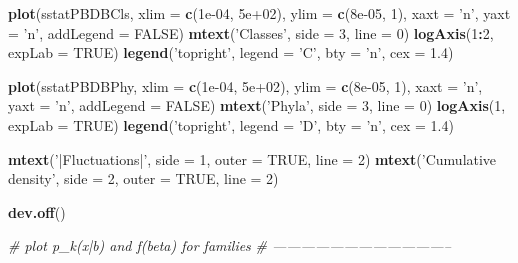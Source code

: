 \documentclass[]{article}
\newenvironment{Shaded}{\begin{snugshade}}{\end{snugshade}}
\newcommand{\KeywordTok}[1]{\textcolor[rgb]{0.13,0.29,0.53}{\textbf{#1}}}
\newcommand{\DataTypeTok}[1]{\textcolor[rgb]{0.13,0.29,0.53}{#1}}
\newcommand{\DecValTok}[1]{\textcolor[rgb]{0.00,0.00,0.81}{#1}}
\newcommand{\FloatTok}[1]{\textcolor[rgb]{0.00,0.00,0.81}{#1}}
\newcommand{\StringTok}[1]{\textcolor[rgb]{0.31,0.60,0.02}{#1}}
\newcommand{\CommentTok}[1]{\textcolor[rgb]{0.56,0.35,0.01}{\textit{#1}}}
\newcommand{\OtherTok}[1]{\textcolor[rgb]{0.56,0.35,0.01}{#1}}
\newcommand{\OperatorTok}[1]{\textcolor[rgb]{0.81,0.36,0.00}{\textbf{#1}}}
\newcommand{\NormalTok}[1]{#1}
\begin{document}
\begin{Shaded}
\begin{Highlighting}[]
{\KeywordTok{plot}\NormalTok{(sstatPBDBCls, }\DataTypeTok{xlim =} \KeywordTok{c}\NormalTok{(}\FloatTok{1e-04}\NormalTok{, }\FloatTok{5e+02}\NormalTok{), }\DataTypeTok{ylim =} \KeywordTok{c}\NormalTok{(}\FloatTok{8e-05}\NormalTok{, }\DecValTok{1}\NormalTok{), }\DataTypeTok{xaxt =} \StringTok{'n'}\NormalTok{, }\DataTypeTok{yaxt =} \StringTok{'n'}\NormalTok{, }
     \DataTypeTok{addLegend =} \OtherTok{FALSE}\NormalTok{)}
\KeywordTok{mtext}\NormalTok{(}\StringTok{'Classes'}\NormalTok{, }\DataTypeTok{side =} \DecValTok{3}\NormalTok{, }\DataTypeTok{line =} \DecValTok{0}\NormalTok{)}
\KeywordTok{logAxis}\NormalTok{(}\DecValTok{1}\OperatorTok{:}\DecValTok{2}\NormalTok{, }\DataTypeTok{expLab =} \OtherTok{TRUE}\NormalTok{)}
\KeywordTok{legend}\NormalTok{(}\StringTok{'topright'}\NormalTok{, }\DataTypeTok{legend =} \StringTok{'C'}\NormalTok{, }\DataTypeTok{bty =} \StringTok{'n'}\NormalTok{, }\DataTypeTok{cex =} \FloatTok{1.4}\NormalTok{)}

\KeywordTok{plot}\NormalTok{(sstatPBDBPhy, }\DataTypeTok{xlim =} \KeywordTok{c}\NormalTok{(}\FloatTok{1e-04}\NormalTok{, }\FloatTok{5e+02}\NormalTok{), }\DataTypeTok{ylim =} \KeywordTok{c}\NormalTok{(}\FloatTok{8e-05}\NormalTok{, }\DecValTok{1}\NormalTok{), }\DataTypeTok{xaxt =} \StringTok{'n'}\NormalTok{, }\DataTypeTok{yaxt =} \StringTok{'n'}\NormalTok{, }
     \DataTypeTok{addLegend =} \OtherTok{FALSE}\NormalTok{)}
\KeywordTok{mtext}\NormalTok{(}\StringTok{'Phyla'}\NormalTok{, }\DataTypeTok{side =} \DecValTok{3}\NormalTok{, }\DataTypeTok{line =} \DecValTok{0}\NormalTok{)}
\KeywordTok{logAxis}\NormalTok{(}\DecValTok{1}\NormalTok{, }\DataTypeTok{expLab =} \OtherTok{TRUE}\NormalTok{)}
\KeywordTok{legend}\NormalTok{(}\StringTok{'topright'}\NormalTok{, }\DataTypeTok{legend =} \StringTok{'D'}\NormalTok{, }\DataTypeTok{bty =} \StringTok{'n'}\NormalTok{, }\DataTypeTok{cex =} \FloatTok{1.4}\NormalTok{)}

\KeywordTok{mtext}\NormalTok{(}\StringTok{'|Fluctuations|'}\NormalTok{, }\DataTypeTok{side =} \DecValTok{1}\NormalTok{, }\DataTypeTok{outer =} \OtherTok{TRUE}\NormalTok{, }\DataTypeTok{line =} \DecValTok{2}\NormalTok{)}
\KeywordTok{mtext}\NormalTok{(}\StringTok{'Cumulative density'}\NormalTok{, }\DataTypeTok{side =} \DecValTok{2}\NormalTok{, }\DataTypeTok{outer =} \OtherTok{TRUE}\NormalTok{, }\DataTypeTok{line =} \DecValTok{2}\NormalTok{)}

\KeywordTok{dev.off}\NormalTok{()}




\CommentTok{# plot p_k(x|b) and f(beta) for families}
\CommentTok{# --------------------------------------}


}
\end{Highlighting}
\end{Shaded}
\end{document}
